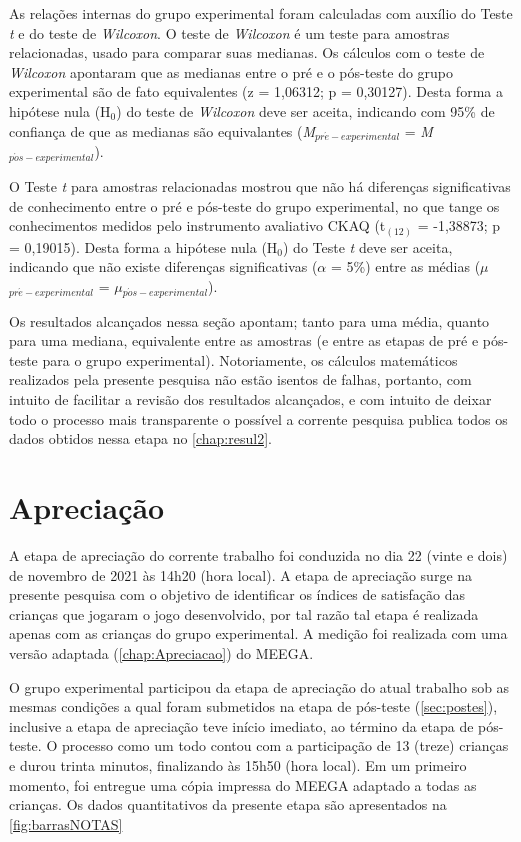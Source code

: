 As relações internas do grupo experimental foram calculadas com auxílio do Teste \textit{t} e do teste de \textit{Wilcoxon}. O teste de \textit{Wilcoxon} é um teste para amostras relacionadas, usado para comparar suas medianas. Os cálculos com o teste de \textit{Wilcoxon} apontaram que as medianas entre o pré e o pós-teste do grupo experimental são de fato equivalentes (z = 1,06312; p = 0,30127). Desta forma a hipótese nula (H$_0$) do teste de \textit{Wilcoxon} deve ser aceita, indicando com 95\% de confiança de que as medianas são equivalantes (\textit{M}$_{pr\acute{e}-experimental}$ = \textit{M}$_{p\acute{o}s-experimental}$). 

O Teste \textit{t} para amostras relacionadas mostrou que não há diferenças significativas de conhecimento entre o pré e pós-teste do grupo experimental, no que tange os conhecimentos medidos pelo instrumento avaliativo \ac{CKAQ} (t$_{(12)}$ = -1,38873; p = 0,19015). Desta forma a hipótese nula (H$_0$) do Teste \textit{t} deve ser aceita, indicando que não existe diferenças significativas ($\alpha$ = 5\%) entre as médias ($\mu$$_{pr\acute{e}-experimental}$ = $\mu$$_{p\acute{o}s-experimental}$).

Os resultados alcançados nessa seção apontam; tanto para uma média, quanto para uma mediana, equivalente entre as amostras (e entre as etapas de pré e pós-teste para o grupo experimental). Notoriamente, os cálculos matemáticos realizados pela presente pesquisa não estão isentos de falhas, portanto, com intuito de facilitar a revisão dos resultados alcançados, e com intuito de deixar todo o processo mais transparente o possível a corrente pesquisa publica todos os dados obtidos nessa etapa no \autoref{chap:resul2}.


\section{Apreciação}\label{sec:apreciar}

A etapa de apreciação do corrente trabalho foi conduzida no dia 22 (vinte e dois) de novembro de 2021 às 14h20 (hora local). A etapa de apreciação surge na presente pesquisa com o objetivo de identificar os índices de satisfação das crianças que jogaram o jogo desenvolvido, por tal razão tal etapa é realizada apenas com as crianças do grupo experimental. A medição foi realizada com uma versão adaptada (\autoref{chap:Apreciacao}) do \acf{MEEGA}.

O grupo experimental participou da etapa de apreciação do atual trabalho sob as mesmas condições a qual foram submetidos na etapa de pós-teste (\autoref{sec:postes}), inclusive a etapa de apreciação teve início imediato, ao término da etapa de pós-teste. O processo como um todo contou com a participação de 13 (treze) crianças e durou trinta minutos, finalizando às 15h50 (hora local). Em um primeiro momento, foi entregue uma cópia impressa do \ac{MEEGA} adaptado a todas as crianças. Os dados quantitativos da presente etapa são apresentados na \autoref{fig:barrasNOTAS}

